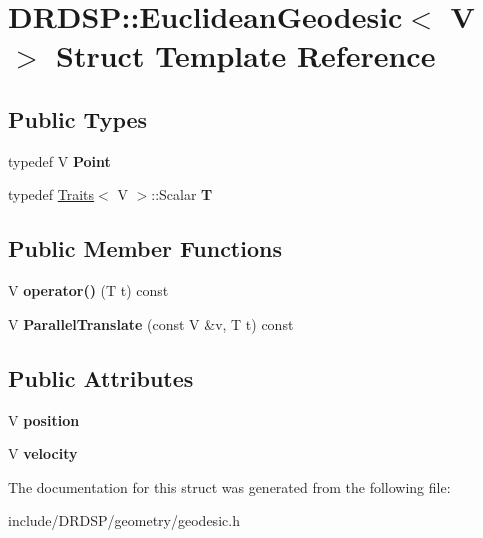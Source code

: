 \hypertarget{struct_d_r_d_s_p_1_1_euclidean_geodesic}{\section{D\-R\-D\-S\-P\-:\-:Euclidean\-Geodesic$<$ V $>$ Struct Template Reference}
\label{struct_d_r_d_s_p_1_1_euclidean_geodesic}
}
\subsection*{Public Types}
\begin{DoxyCompactItemize}
\item 
\hypertarget{struct_d_r_d_s_p_1_1_euclidean_geodesic_a2d680202c1b8052de7b66eeecdfdc172}{typedef V {\bfseries Point}}\label{struct_d_r_d_s_p_1_1_euclidean_geodesic_a2d680202c1b8052de7b66eeecdfdc172}

\item 
\hypertarget{struct_d_r_d_s_p_1_1_euclidean_geodesic_a48f7ccb01a9318db94fe83667c4081c3}{typedef \hyperlink{struct_d_r_d_s_p_1_1_traits}{Traits}$<$ V $>$\-::Scalar {\bfseries T}}\label{struct_d_r_d_s_p_1_1_euclidean_geodesic_a48f7ccb01a9318db94fe83667c4081c3}

\end{DoxyCompactItemize}
\subsection*{Public Member Functions}
\begin{DoxyCompactItemize}
\item 
\hypertarget{struct_d_r_d_s_p_1_1_euclidean_geodesic_ac6ebb89dcf49e9b49cd09459a7c6c3c9}{V {\bfseries operator()} (T t) const }\label{struct_d_r_d_s_p_1_1_euclidean_geodesic_ac6ebb89dcf49e9b49cd09459a7c6c3c9}

\item 
\hypertarget{struct_d_r_d_s_p_1_1_euclidean_geodesic_a7281af38e6d140df5eb75dd33ed4d301}{V {\bfseries Parallel\-Translate} (const V \&v, T t) const }\label{struct_d_r_d_s_p_1_1_euclidean_geodesic_a7281af38e6d140df5eb75dd33ed4d301}

\end{DoxyCompactItemize}
\subsection*{Public Attributes}
\begin{DoxyCompactItemize}
\item 
\hypertarget{struct_d_r_d_s_p_1_1_euclidean_geodesic_afe3a4283421a10c3afc8d26cc470c2ef}{V {\bfseries position}}\label{struct_d_r_d_s_p_1_1_euclidean_geodesic_afe3a4283421a10c3afc8d26cc470c2ef}

\item 
\hypertarget{struct_d_r_d_s_p_1_1_euclidean_geodesic_a47f27a24d96442f0a80e7f82424723ce}{V {\bfseries velocity}}\label{struct_d_r_d_s_p_1_1_euclidean_geodesic_a47f27a24d96442f0a80e7f82424723ce}

\end{DoxyCompactItemize}


The documentation for this struct was generated from the following file\-:\begin{DoxyCompactItemize}
\item 
include/\-D\-R\-D\-S\-P/geometry/geodesic.\-h\end{DoxyCompactItemize}
